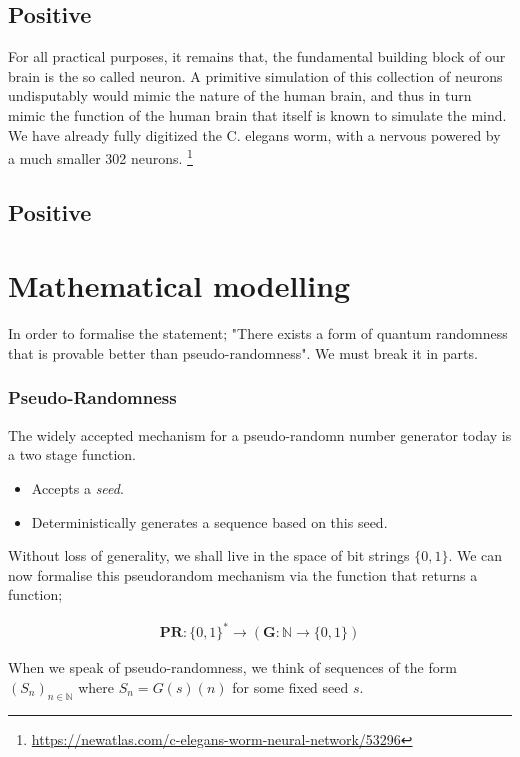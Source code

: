 \documentclass{article}
\begin{document}
\subsection*{Positive}
For all practical purposes, it remains that, the fundamental building block of our brain is the so called neuron. A primitive simulation of this collection of neurons undisputably would mimic the nature of the human brain, and thus in turn mimic the function of the human brain that itself is known to simulate the mind. We have already fully digitized the C. elegans worm, with a nervous powered by a much smaller 302 neurons. \footnote{\url{https://newatlas.com/c-elegans-worm-neural-network/53296}}

\subsection*{Positive}

\pagebreak
\section*{Mathematical modelling}
In order to formalise the statement; "There exists a form of quantum randomness that is provable better than pseudo-randomness". We must break it in parts.

\subsubsection*{Pseudo-Randomness}
The widely accepted mechanism for a pseudo-randomn number generator today is a two stage function.

\begin{itemize}
	\item{Accepts a \emph{seed}.}
	\item{Deterministically generates a sequence based on this seed.}
\end{itemize}

Without loss of generality, we shall live in the space of bit strings $\{0, 1\}$. We can now formalise this pseudorandom mechanism via the function that returns a function;

\begin{align*}
	\bm{PR}: \{0,1\}^* \rightarrow (\bm{G}: \mathbb{N} \rightarrow \{0,1\})
\end{align*}

When we speak of pseudo-randomness, we think of sequences of the form $(S_n)_{n \in \mathbb{N}}$ where $S_n = G(s)(n)$ for some fixed seed $s$.
\end{document}
